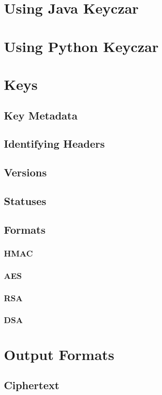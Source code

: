 \documentclass{llncs}
\begin{document}
\section{Using Java Keyczar}

\section{Using Python Keyczar}

\section{Keys}
\subsection{Key Metadata}\label{metadata}
\subsection{Identifying Headers}
\subsection{Versions}\label{versions}
\subsection{Statuses}\label{status}
\subsection{Formats}
\subsubsection{HMAC}
\subsubsection{AES}
\subsubsection{RSA}
\subsubsection{DSA}



\section{Output Formats}
\subsection{Ciphertext}
\end{document}
